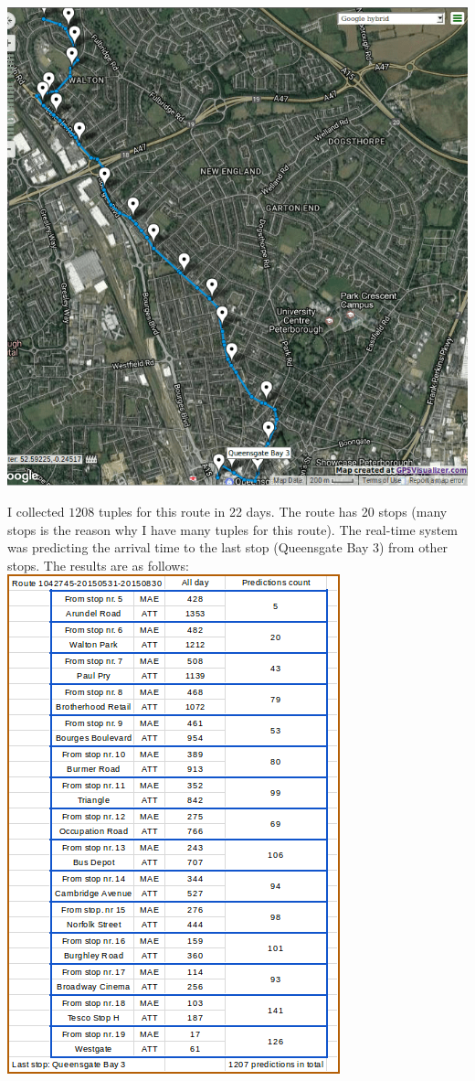 \documentclass[12pt,a4paper,oneside,openright]{report}
\begin{document}
\:

\includegraphics[scale=0.6]{figs/real_time_route.png}

I collected $1208$ tuples for this route in 22 days. The route has 20 stops (many stops is the
reason why I have many tuples for this route). The real-time system was predicting the
arrival time to the last stop (Queensgate Bay 3) from other stops.
The results are as follows: \\

\includegraphics[scale=0.8]{figs/real_time_1042745.png}
\end{document}
